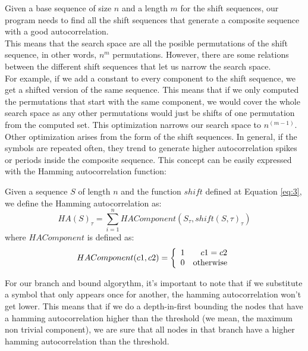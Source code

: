   Given a base sequence of size $n$ and a length $m$ for the shift sequences,
  our program needs to find all the shift sequences that generate a composite
  sequence with a good autocorrelation.\\

  This means that the search space are all the posible permutations of the
  shift sequence, in other words, $n^m$ permutations. However, there are some
  relations between the different shift sequences that let us narrow the
  search space.\\

  For example, if we add a constant to every component to the shift sequence,
  we get a shifted version of the same sequence. This means that if we only
  computed the permutations that start with the same component, we would cover
  the whole search space as any other permutations would just be shifts of
  one permutation from the computed set. This optimization narrows our
  search space to $n^{(m-1)}$.\\

  Other optimization arises from the form of the shift sequences. In general,
  if the symbols are repeated often, they trend to generate higher
  autocorrelation spikes or periods inside the composite sequence. This
  concept can be easily expressed with the Hamming autocorrelation function:\\

  \begin{definition}
    Given a sequence $S$ of length $n$ and the function $shift$ defined at
    Equation \ref{eq:3}, we define the Hamming autocorrelation as:
      \begin{equation} \label{hamming:eq:1}
        HA(S)_{\tau} = \sum_{i=1}^{n} HAComponent(S_{\tau}, shift(S, \tau)_{\tau})
      \end{equation}
    where $HAComponent$ is defined as:
      \begin{equation}
        HAComponent(c1, c2) = \left\{\begin{array}{lr}
            1  &  c1 = c2\\
            0  & \textnormal{otherwise} \\
        \end{array}\right.
      \end{equation}
  \end{definition}

  For our branch and bound algorythm, it's important to note that if we
  substitute a symbol that only appears once for another, the hamming
  autocorrelation won't get lower. This means that if we do a depth-in-first
  bounding the nodes that have a hamming autocorrelation higher than the
  threshold (we mean, the maximum non trivial component), we are sure that all
  nodes in that branch have a higher hamming autocorrelation than the
  threshold.\\


